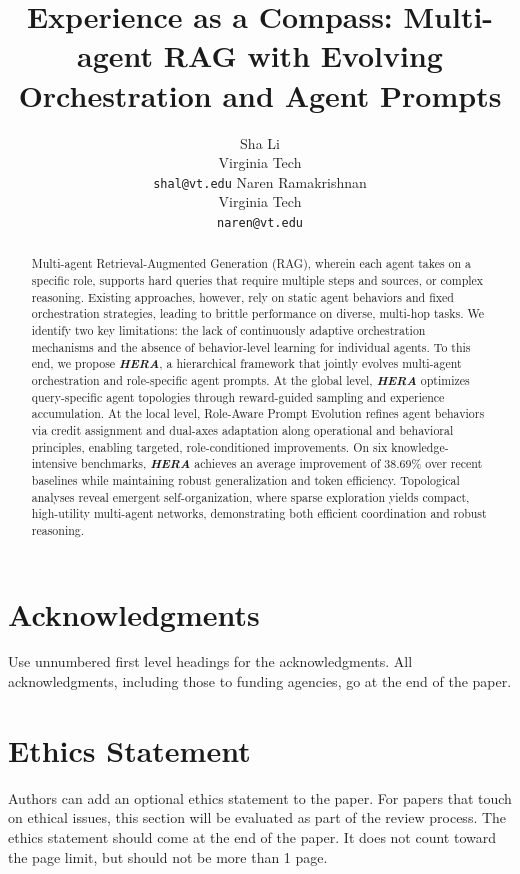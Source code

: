 \documentclass{article} %
\title{Experience as a Compass: Multi-agent RAG with Evolving Orchestration and Agent Prompts}
\author{
Sha Li \\
Virginia Tech \\
\texttt{shal@vt.edu}
\And
Naren Ramakrishnan \\
Virginia Tech \\
\texttt{naren@vt.edu}
}
\def\hero{\textit{\textbf{HERA}}\xspace}
\begin{document}
\ifcolmsubmission
\linenumbers
\fi

\maketitle

\begin{abstract}
Multi-agent Retrieval-Augmented Generation (RAG), wherein each agent takes on a specific role, supports hard queries that
require multiple steps and sources, or complex reasoning. 
Existing approaches, however, rely on
static agent behaviors and fixed orchestration strategies, leading to brittle performance on diverse, multi-hop tasks. We identify two key limitations: the lack of continuously adaptive orchestration mechanisms and the absence of behavior-level learning for individual agents. To this end, we propose \hero, a hierarchical framework that jointly evolves multi-agent orchestration and role-specific agent prompts. At the global level, \hero optimizes query-specific agent topologies through reward-guided sampling and experience accumulation. At the local level, Role-Aware Prompt Evolution refines agent behaviors via credit assignment and dual-axes adaptation along operational and behavioral principles, enabling targeted, role-conditioned improvements. On six knowledge-intensive benchmarks, \hero achieves an average improvement of 38.69\% over recent baselines while maintaining robust generalization and token efficiency. Topological analyses reveal emergent self-organization, where sparse exploration yields compact, high-utility multi-agent networks, demonstrating both efficient coordination and robust reasoning.



\end{abstract}









\section*{Acknowledgments}
Use unnumbered first level headings for the acknowledgments. All
acknowledgments, including those to funding agencies, go at the end of the paper.

\section*{Ethics Statement}
Authors can add an optional ethics statement to the paper. 
For papers that touch on ethical issues, this section will be evaluated as part of the review process. The ethics statement should come at the end of the paper. It does not count toward the page limit, but should not be more than 1 page. 








\end{document}
